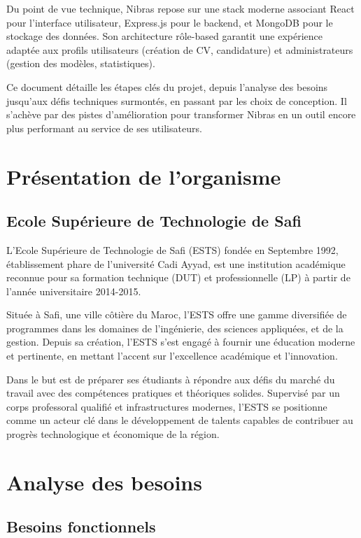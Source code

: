 \documentclass{report}
\begin{document}
Du point de vue technique, Nibras repose sur une stack moderne associant React pour l'interface utilisateur, Express.js pour le backend, et MongoDB pour le stockage des données. Son architecture rôle-based garantit une expérience adaptée aux profils utilisateurs (création de CV, candidature) et administrateurs (gestion des modèles, statistiques).

Ce document détaille les étapes clés du projet, depuis l'analyse des besoins jusqu'aux défis techniques surmontés, en passant par les choix de conception. Il s'achève par des pistes d'amélioration pour transformer Nibras en un outil encore plus performant au service de ses utilisateurs.

\vspace*{\fill} %

\section{Présentation de l'organisme}
\clearpage
\subsection{Ecole Supérieure de Technologie de Safi}
L'Ecole Supérieure de Technologie de Safi (ESTS) fondée en Septembre 1992, établissement phare de l'université Cadi Ayyad, est une institution académique reconnue pour sa formation technique (DUT) et professionnelle (LP) à partir de l'année universitaire 2014-2015.  

Située à Safi, une ville côtière du Maroc, l'ESTS offre une gamme diversifiée de programmes dans les domaines de l'ingénierie, des sciences appliquées, et de la gestion. Depuis sa création, l'ESTS s'est engagé à fournir une éducation moderne et pertinente, en mettant l'accent sur l'excellence académique et l'innovation.  

Dans le but est de préparer ses étudiants à répondre aux défis du marché du travail avec des compétences pratiques et théoriques solides. Supervisé par un corps professoral qualifié et infrastructures modernes, l'ESTS se positionne comme un acteur clé dans le développement de talents capables de contribuer au progrès technologique et économique de la région.  

\section{Analyse des besoins}
\clearpage
\subsection{Besoins fonctionnels}
\end{document}

